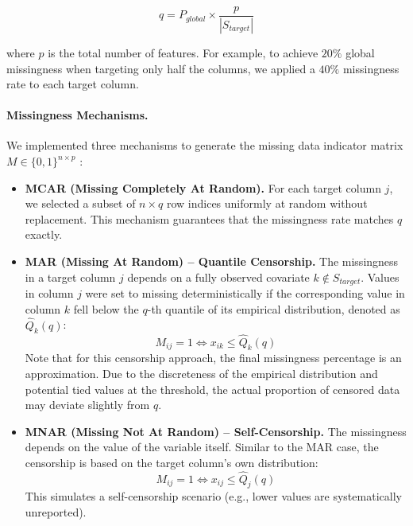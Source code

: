 \documentclass[11pt, a4paper]{article}
\begin{document}
\begin{equation}
    q = P_{global} \times \frac{p}{|S_{target}|}
\end{equation}

where $p$ is the total number of features.
For example, to achieve $20\%$ global missingness when targeting only half the columns, we applied a $40\%$ missingness rate to each target column.

\paragraph{Missingness Mechanisms.}
We implemented three mechanisms to generate the missing data indicator matrix $M \in \{0,1\}^{n \times p}$ \citep{Schouten2018}:

\begin{itemize}
    \item \textbf{MCAR (Missing Completely At Random).} For each target column $j$, we selected a subset of $n \times q$ row indices uniformly at random without replacement. This mechanism guarantees that the missingness rate matches $q$ exactly.

    \item \textbf{MAR (Missing At Random) -- Quantile Censorship.} The missingness in a target column $j$ depends on a fully observed covariate $k \notin S_{target}$. Values in column $j$ were set to missing deterministically if the corresponding value in column $k$ fell below the $q$-th quantile of its empirical distribution, denoted as $\hat{Q}_k(q)$:
    \begin{equation}
        M_{ij} = 1 \iff x_{ik} \leq \hat{Q}_k(q)
    \end{equation}
    Note that for this censorship approach, the final missingness percentage is an approximation. Due to the discreteness of the empirical distribution and potential tied values at the threshold, the actual proportion of censored data may deviate slightly from $q$.

    \item \textbf{MNAR (Missing Not At Random) -- Self-Censorship.} The missingness depends on the value of the variable itself. Similar to the MAR case, the censorship is based on the target column's own distribution:
    \begin{equation}
        M_{ij} = 1 \iff x_{ij} \leq \hat{Q}_j(q)
    \end{equation}
    This simulates a self-censorship scenario (e.g., lower values are systematically unreported).
\end{itemize}
\end{document}
